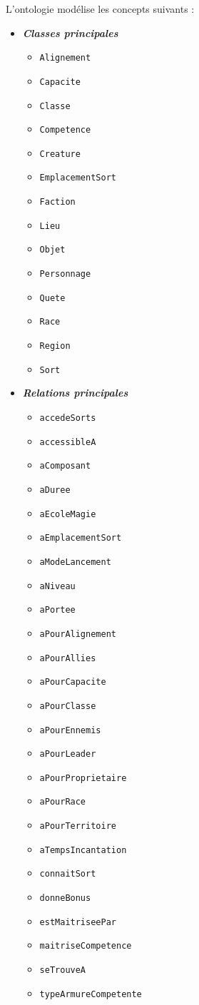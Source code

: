\documentclass{article}
\newcommand{\cmd}[1]{\texttt{#1}}
\newcommand{\ib}[1]{\textit{\textbf{#1}}}
\begin{document}
L'ontologie modélise les concepts suivants :
\begin{itemize}
	\item \ib{Classes principales}
	\begin{itemize}
		\item \cmd{Alignement}
		\item \cmd{Capacite}
		\item \cmd{Classe}
		\item \cmd{Competence}
		\item \cmd{Creature}
		\item \cmd{EmplacementSort}
		\item \cmd{Faction}
		\item \cmd{Lieu}
		\item \cmd{Objet}
		\item \cmd{Personnage}
		\item \cmd{Quete}
		\item \cmd{Race}
		\item \cmd{Region}
		\item \cmd{Sort}
	\end{itemize}
	\item \ib{Relations principales}
	\begin{itemize}
		\item \cmd{accedeSorts}
		\item \cmd{accessibleA}
		\item \cmd{aComposant}
		\item \cmd{aDuree}
		\item \cmd{aEcoleMagie}
		\item \cmd{aEmplacementSort}
		\item \cmd{aModeLancement}
		\item \cmd{aNiveau}
		\item \cmd{aPortee}
		\item \cmd{aPourAlignement}
		\item \cmd{aPourAllies}
		\item \cmd{aPourCapacite}
		\item \cmd{aPourClasse}
		\item \cmd{aPourEnnemis}
		\item \cmd{aPourLeader}
		\item \cmd{aPourProprietaire}
		\item \cmd{aPourRace}
		\item \cmd{aPourTerritoire}
		\item \cmd{aTempsIncantation}
		\item \cmd{connaitSort}
		\item \cmd{donneBonus}
		\item \cmd{estMaitriseePar}
		\item \cmd{maitriseCompetence}
		\item \cmd{seTrouveA}
		\item \cmd{typeArmureCompetente}
	\end{itemize}
\end{itemize}
\end{document}
